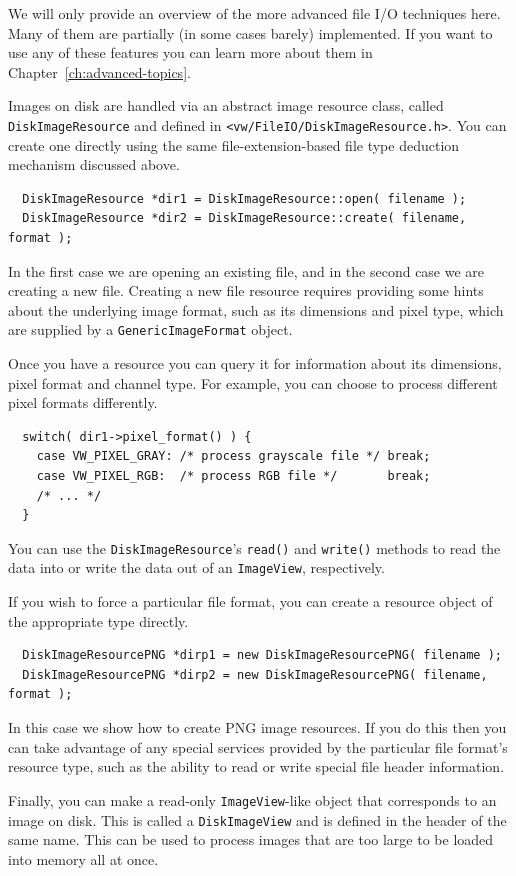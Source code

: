 We will only provide an overview of the more advanced file I/O 
techniques here.  Many of them are partially (in some cases barely) 
implemented.  If you want to use any of these features you can 
learn more about them in Chapter~\ref{ch:advanced-topics}.

Images on disk are handled via an abstract image resource
class, called \verb#DiskImageResource# and defined in
\verb#<vw/FileIO/DiskImageResource.h>#.  You can create one directly 
using the same file-extension-based file type deduction mechanism 
discussed above.
\begin{verbatim}
  DiskImageResource *dir1 = DiskImageResource::open( filename );
  DiskImageResource *dir2 = DiskImageResource::create( filename, format );
\end{verbatim}
In the first case we are opening an existing file, and in the second 
case we are creating a new file.  Creating a new file resource requires 
providing some hints about the underlying image format, such as its 
dimensions and pixel type, which are supplied by a \verb#GenericImageFormat# 
object.

Once you have a resource you can query it for information about its 
dimensions, pixel format and channel type.  For example, you can choose 
to process different pixel formats differently.
\begin{verbatim}
  switch( dir1->pixel_format() ) {
    case VW_PIXEL_GRAY: /* process grayscale file */ break;
    case VW_PIXEL_RGB:  /* process RGB file */       break;
    /* ... */
  }
\end{verbatim}
You can use the \verb#DiskImageResource#'s \verb#read()# and \verb#write()# 
methods to read the data into or write the data out of an \verb#ImageView#, 
respectively.

If you wish to force a particular file format, you can create a resource 
object of the appropriate type directly.
\begin{verbatim}
  DiskImageResourcePNG *dirp1 = new DiskImageResourcePNG( filename );
  DiskImageResourcePNG *dirp2 = new DiskImageResourcePNG( filename, format );
\end{verbatim}
In this case we show how to create PNG image resources.  If you do this 
then you can take advantage of any special services provided by the 
particular file format's resource type, such as the ability to read or 
write special file header information.

Finally, you can make a read-only \verb#ImageView#-like object that 
corresponds to an image on disk.  This is called a \verb#DiskImageView# 
and is defined in the header of the same name.  This can be used to 
process images that are too large to be loaded into memory all at once. 

